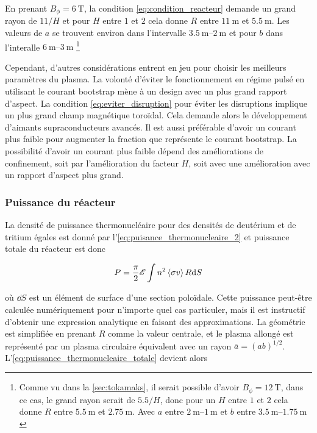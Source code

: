\documentclass[main.tex]{subfiles}
\begin{document}
En prenant \( B_\phi = \SI{6}{\tesla} \), la condition \ref{eq:condition_reacteur} demande un grand rayon de \( 11/H \) et pour \( H \) entre \( 1 \) et \( 2 \) cela donne \( R \) entre \( \SI{11}{\meter} \) et \( \SI{5.5}{\meter} \).
Les valeurs de \( a \) se trouvent environ dans l'intervalle \(  \qtyrange[range-units=single,range-phrase=-]{3.5}{2}{\meter} \) et pour \( b \) dans l'interalle \(  \qtyrange[range-units=single,range-phrase=-]{6}{3}{\meter} \)
\footnote{Comme vu dans la \autoref{sec:tokamaks}, il serait possible d'avoir \( B_\phi = \SI{12}{\tesla} \), dans ce cas, le grand rayon serait de \( 5.5/H \), donc pour un \( H \) entre \( 1 \) et \( 2 \) cela donne \( R \) entre \( \SI{5.5}{\meter} \) et \( \SI{2.75}{\meter} \). Avec \( a \) entre \( \qtyrange[range-units=single,range-phrase=-]{2}{1}{\meter} \) et \( b \) entre \( \qtyrange[range-units=single,range-phrase=-]{3.5}{1.75}{\meter} \)}

Cependant, d'autres considérations entrent en jeu pour choisir les meilleurs paramètres du plasma.
La volonté d'éviter le fonctionnement en régime pulsé en utilisant le courant bootstrap mène à un design avec un plus grand rapport d'aspect.
La condition \ref{eq:eviter_disruption} pour éviter les disruptions implique un plus grand champ magnétique toroïdal.
Cela demande alors le développement d'aimants supraconducteurs avancés.
Il est aussi préférable d'avoir un courant plus faible pour augmenter la fraction que représente le courant bootstrap.
La possibilité d'avoir un courant plus faible dépend des améliorations de confinement, soit par l'amélioration du facteur \( H \), soit avec une amélioration avec un rapport d'aspect plus grand.

\subsubsection*{Puissance du réacteur}

La densité de puissance thermonucléaire pour des densités de deutérium et de tritium égales est donné par l'\autoref{eq:puisance_thermonucleaire_2} et puissance totale du réacteur est donc

\begin{equation}
	P = \frac{\pi}{2} \mathscr{E}\int n^2 \left\langle \sigma v \right\rangle R \text{d} S
	\label{eq:puissance_thermonucleaire_totale}
\end{equation}

où \( \dd S \) est un élément de surface d'une section poloïdale.
Cette puissance peut-être calculée numériquement pour n'importe quel cas particuler, mais il est instructif d'obtenir une expression analytique en faisant des approximations.
La géométrie est simplifiée en prenant \( R \) comme la valeur centrale, et le plasma allongé est représenté par un plasma circulaire équivalent avec un rayon \( \overline{a} = (ab)^{1/2}\).
L'\autoref{eq:puissance_thermonucleaire_totale} devient alors
\end{document}
